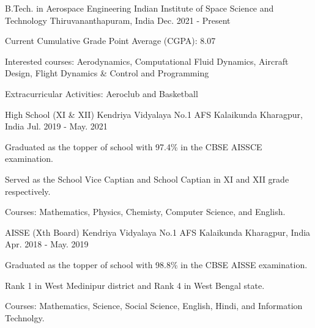 

\begin{cventries}

  \cventry
  {B.Tech. in Aerospace Engineering} %
  {Indian Institute of Space Science and Technology} %
  {Thiruvananthapuram, India} %
  {Dec. 2021 - Present} %
  {
    \begin{cvitems} %
      \item {Current Cumulative Grade Point Average (CGPA): 8.07}
      \item {Interested courses: Aerodynamics, Computational Fluid Dynamics, Aircraft Design, Flight Dynamics \& Control and Programming}
      \item {Extracurricular Activities: Aeroclub and Basketball}
    \end{cvitems}
  }

  \cventry
  {High School (XI \& XII)} %
  {Kendriya Vidyalaya No.1 AFS Kalaikunda} %
  {Kharagpur, India} %
  {Jul. 2019 - May. 2021} %
  {
    \begin{cvitems} %
      \item {Graduated as the topper of school with 97.4\% in the CBSE AISSCE examination.}
      \item {Served as the School Vice Captian and School Captian in XI and XII grade respectively.}
      \item {Courses: Mathematics, Physics, Chemisty, Computer Science, and English.}
    \end{cvitems}
  }

  \cventry
  {AISSE (Xth Board)} %
  {Kendriya Vidyalaya No.1 AFS Kalaikunda} %
  {Kharagpur, India} %
  {Apr. 2018 - May. 2019} %
  {
    \begin{cvitems} %
      \item {Graduated as the topper of school with 98.8\% in the CBSE AISSE examination.}
      \item {Rank 1 in West Medinipur district and Rank 4 in West Bengal state.}
      \item {Courses: Mathematics, Science, Social Science, English, Hindi, and Information Technolgy.}
    \end{cvitems}
  }

\end{cventries}
